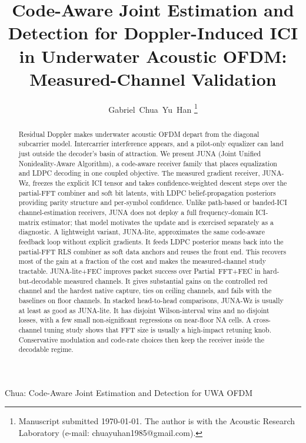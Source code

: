 \documentclass[journal]{IEEEtran}
\newcommand{\juna}{JUNA}
\newcommand{\junalite}{JUNA-lite}
\newcommand{\junawz}{JUNA-Wz}
\begin{document}
\title{Code-Aware Joint Estimation and Detection for Doppler-Induced ICI in
Underwater Acoustic OFDM: Measured-Channel Validation}

\author{Gabriel~Chua~Yu~Han
\thanks{Manuscript submitted \today. The author is with the Acoustic Research
Laboratory (e-mail: chuayuhan1985@gmail.com).}}

%
{Chua: Code-Aware Joint Estimation and Detection for UWA OFDM}
\maketitle

\begin{abstract}
Residual Doppler makes underwater acoustic OFDM depart from the diagonal
subcarrier model. Intercarrier interference appears, and a pilot-only equalizer
can land just outside the decoder's basin of attraction. We present \juna{}
(Joint Unified Nonideality-Aware Algorithm), a code-aware receiver family that
places equalization and LDPC decoding in one coupled objective. The measured
gradient receiver, \junawz{}, freezes the explicit ICI tensor and takes
confidence-weighted descent steps over the partial-FFT combiner and soft bit
latents, with LDPC belief-propagation posteriors providing parity structure and
per-symbol confidence. Unlike path-based or banded-ICI channel-estimation
receivers, \juna{} does not deploy a full frequency-domain ICI-matrix estimator;
that model motivates the update and is exercised separately as a diagnostic. A
lightweight variant, \junalite{}, approximates the same code-aware feedback loop
without explicit gradients. It feeds LDPC posterior means back into the
partial-FFT RLS combiner as soft data anchors and reuses the front end. This
recovers most of the gain at a fraction of the cost and makes the
measured-channel study tractable. \junalite{}+FEC improves packet success over
Partial~FFT+FEC in hard-but-decodable measured channels. It gives substantial
gains on the controlled red channel and the hardest native capture, ties on
ceiling channels, and fails with the baselines on floor channels. In stacked
head-to-head comparisons, \junawz{} is usually at least as good as \junalite{}.
It has disjoint Wilson-interval wins and no disjoint losses, with a few small
non-significant regressions on near-floor NA cells. A cross-channel tuning study
shows that FFT size is usually a high-impact retuning knob. Conservative
modulation and code-rate choices then keep the receiver inside the decodable
regime.
\end{abstract}
\end{document}
